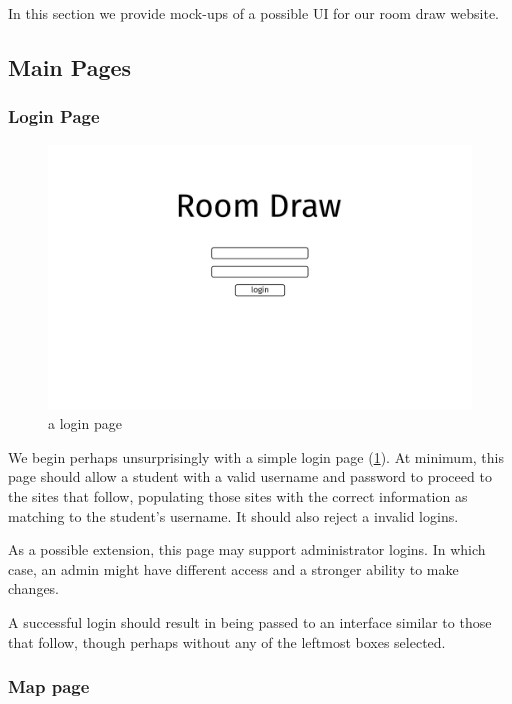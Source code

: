 In this section we provide mock-ups of a possible UI for our room draw website.

\subsection{Main Pages}
\subsubsection{Login Page}

\begin{figure} \centering
\includegraphics[scale=.15]{wireframe/login}
\caption{a login page}
\label{fig:wirelogin}
\end{figure}

We begin perhaps unsurprisingly with a simple login page (\cref{fig:wirelogin}).
At minimum, this page should allow a student with a valid username and password
to proceed to the sites that follow, populating those sites with the correct
information as matching to the student's username. It should also reject a
invalid logins.

As a possible extension, this page may support administrator logins. In which
case, an admin might have different access and a stronger ability to make
changes.

A successful login should result in being passed to an interface similar to
those that follow, though perhaps without any of the leftmost boxes selected.

\subsubsection{Map page}

